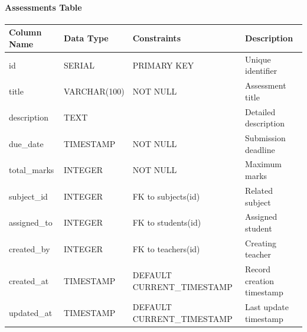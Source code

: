 \documentclass[12pt,a4paper]{report}
\begin{document}
\paragraph{Assessments Table}
\begin{longtable}{|p{3cm}|p{3cm}|p{2cm}|p{6cm}|}
\hline
\textbf{Column Name} & \textbf{Data Type} & \textbf{Constraints} & \textbf{Description} \\
\hline
\endhead
id & SERIAL & PRIMARY KEY & Unique identifier \\
\hline
title & VARCHAR(100) & NOT NULL & Assessment title \\
\hline
description & TEXT & & Detailed description \\
\hline
due\_date & TIMESTAMP & NOT NULL & Submission deadline \\
\hline
total\_marks & INTEGER & NOT NULL & Maximum marks \\
\hline
subject\_id & INTEGER & FK to subjects(id) & Related subject \\
\hline
assigned\_to & INTEGER & FK to students(id) & Assigned student \\
\hline
created\_by & INTEGER & FK to teachers(id) & Creating teacher \\
\hline
created\_at & TIMESTAMP & DEFAULT CURRENT\_TIMESTAMP & Record creation timestamp \\
\hline
updated\_at & TIMESTAMP & DEFAULT CURRENT\_TIMESTAMP & Last update timestamp \\
\hline
\end{longtable}
\end{document}
